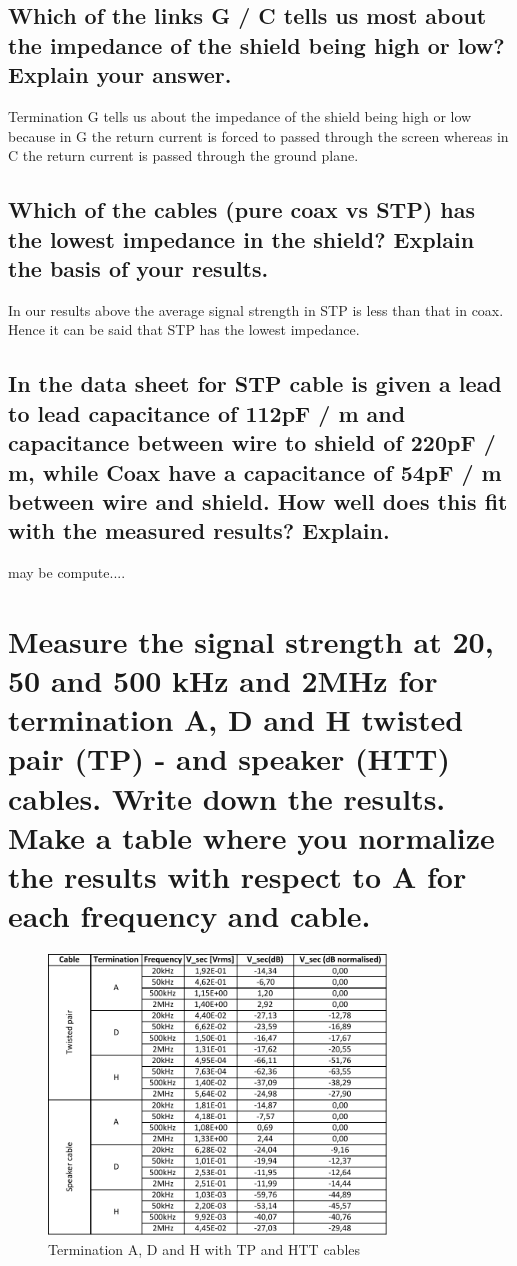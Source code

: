\documentclass[12pt,a4paper,UKenglish]{article}
\begin{document}
\subsection{Which of the links G / C tells us most about the impedance of the shield being high or low? Explain your answer.}
Termination G tells us about the impedance of the shield being high or low because in G the return current is forced to passed through the screen whereas in C the return current is passed through the ground plane.

\subsection{Which of the cables (pure coax vs STP) has the lowest impedance in the shield? Explain the basis of your results.}
In our results above the average signal strength in STP is less than that in coax. Hence it can be said that STP has the lowest impedance.

\subsection{In the data sheet for STP cable is given a lead to lead capacitance of 112pF / m and capacitance between wire to shield of 220pF / m, while Coax have a capacitance of 54pF / m between wire and shield. How well does this fit with the measured results? Explain.}
may be compute....

\section{Measure the signal strength at 20, 50 and 500 kHz and 2MHz for termination A, D and H twisted pair (TP) - and speaker (HTT) cables. Write down the results. Make a table where you normalize the results with respect to A for each frequency and cable.}
\begin{figure} [H] %
  \centering 
  \includegraphics[width=0.8\textwidth]{img/task10_data.pdf} 
  \caption{Termination A, D and H with TP and HTT cables}
  \label{fig:task10} 
\end{figure}
\end{document}
